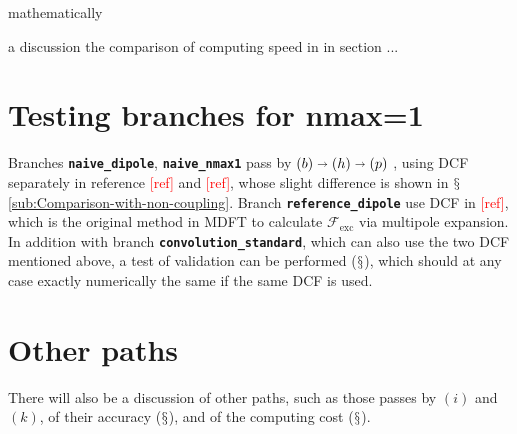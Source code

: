 mathematically 

a discussion the comparison of computing speed in in section ...


\section{Testing branches for nmax=1}

Branches \texttt{\textbf{naive\_dipole}}, \texttt{\textbf{naive\_nmax1}}
pass by $\left(b\right)\shortrightarrow\left(h\right)\shortrightarrow\left(p\right)$
, using DCF separately in reference \textcolor{red}{{[}ref{]}} and
\textcolor{red}{{[}ref{]}}, whose slight difference is shown in $\mathsection$\ref{sub:Comparison-with-non-coupling}.
Branch \texttt{\textbf{reference\_dipole}} use DCF in \textcolor{red}{{[}ref{]}},
which is the original method in MDFT to calculate $\mathcal{F}_{\mathrm{exc}}$
via multipole expansion. In addition with branch \texttt{\textbf{convolution\_standard}},
which can also use the two DCF mentioned above, a test of validation
can be performed ($\mathsection$), which should at any case exactly
numerically the same if the same DCF is used.


\section{Other paths}

There will also be a discussion of other paths, such as those passes
by $\left(i\right)$ and $\left(k\right)$, of their accuracy ($\mathsection$),
and of the computing cost ($\mathsection$).
